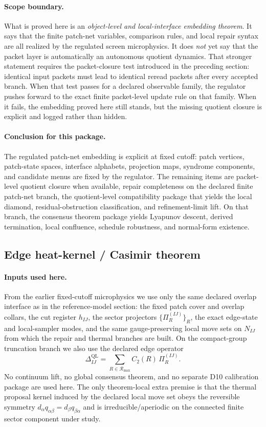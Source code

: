 \documentclass[11pt]{article}
\begin{document}
\paragraph{Scope boundary.}
What is proved here is an \emph{object-level and local-interface embedding theorem}. It says
that the finite patch-net variables, comparison rules, and local repair syntax are all realized
by the regulated screen microphysics. It does \emph{not} yet say that the packet layer is
automatically an autonomous quotient dynamics. That stronger statement requires the
packet-closure test introduced in the preceding section: identical input packets must lead to
identical reread packets after every accepted branch. When that test passes for a declared
observable family, the regulator pushes forward to the exact finite packet-level update rule on
that family. When it fails, the embedding proved here still stands, but the missing quotient
closure is explicit and logged rather than hidden.

\paragraph{Conclusion for this package.}
The regulated patch-net embedding is explicit at fixed cutoff: patch vertices, patch-state spaces, interface alphabets, projection maps, syndrome components, and candidate menus are fixed by the regulator. The remaining items are packet-level quotient closure when available, repair completeness on the declared finite patch-net branch, the quotient-level compatibility package that yields the local diamond, residual-obstruction classification, and refinement-limit lift. On that branch, the consensus theorem package yields Lyapunov descent, derived termination, local confluence, schedule robustness, and normal-form existence.

\subsection{Edge heat-kernel / Casimir theorem}\label{sec:microphysics-feeds-e24}

\paragraph{Inputs used here.}
From the earlier fixed-cutoff microphysics we use only the same declared overlap interface as in
the reference-model section: the fixed patch cover and overlap collars, the cut register
\(h_{IJ}\), the sector projectors \(\{\Pi_R^{(IJ)}\}_R\), the exact edge-state and local-sampler
modes, and the same gauge-preserving local move sets on \(N_{IJ}\) from which the repair and
thermal branches are built. On the compact-group truncation branch we also use the declared edge
operator
\[
\Delta_{IJ}^{\mathrm{QL}}
=
\sum_{R\in \mathcal R_{\max}} C_2(R)\,\Pi_R^{(IJ)}.
\]
No continuum lift, no global consensus theorem, and no separate D10 calibration package are used
here. The only theorem-local extra premise is that the thermal proposal kernel induced by the
declared local move set obeys the reversible symmetry
\(
d_\alpha q_{\alpha\beta}=d_\beta q_{\beta\alpha}
\)
and is irreducible/aperiodic on the connected finite sector component under study.
\end{document}
